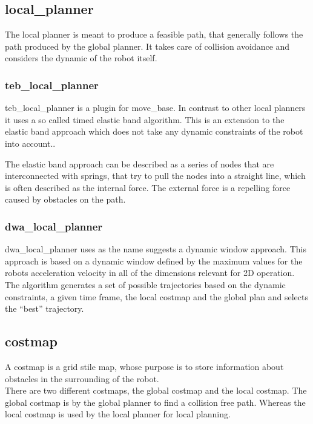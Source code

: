 \subsection{local\_planner}
The local planner is meant to produce a feasible path, that generally follows the path produced by the global planner. It takes care of collision avoidance and considers the dynamic of the robot itself.

\subsubsection{teb\_local\_planner}
teb\_local\_planner is a plugin for move\_base. In contrast to other local planners it uses a so called timed elastic band algorithm. This is an extension to the elastic band approach which does not take any dynamic constraints of the robot into account.\cite{Rsmann2012TrajectoryMC}.

The elastic band approach can be described as a series of nodes that are interconnected with springs, that try to pull the nodes into a straight line, which is often described as the internal force. The external force is a repelling force caused by obstacles on the path\cite{elasticband}.

\subsubsection{dwa\_local\_planner}
dwa\_local\_planner uses as the name suggests a dynamic window approach. This approach is based on a dynamic window defined by the maximum values for the robots acceleration velocity in all of the dimensions relevant for 2D operation.\\
The algorithm generates a set of possible trajectories based on the dynamic constraints, a given time frame, the local costmap and the global plan and selects the ``best'' trajectory\cite{dwa}.

\subsection{costmap}
A costmap is a grid stile map, whose purpose is to store information about obstacles in the surrounding of the robot.\\
There are two different costmaps, the global costmap and the local costmap.
The global costmap is by the global planner to find a collision free path. Whereas the local costmap is used by the local planner for local planning.\cite{navsetup}\\

